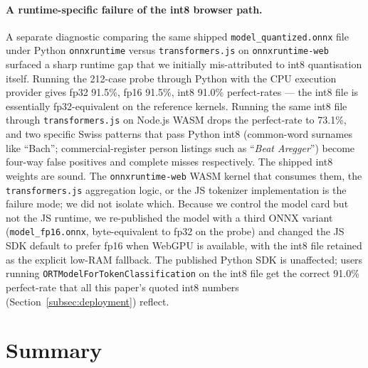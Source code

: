 \documentclass[sigconf,nonacm]{acmart}
\begin{document}
\paragraph{A runtime-specific failure of the int8 browser path.}
A separate diagnostic comparing the same shipped
\texttt{model\_quantized.onnx} file under Python
\texttt{onnxruntime} versus \texttt{transformers.js} on
\texttt{onnxruntime-web} surfaced a sharp runtime gap that we
initially mis-attributed to int8 quantisation itself. Running the
212-case probe through Python with the CPU execution provider gives
fp32 91.5\%, fp16 91.5\%, int8 91.0\% perfect-rates --- the int8
file is essentially fp32-equivalent on the reference kernels.
Running the same int8 file through \texttt{transformers.js} on
Node.js WASM drops the perfect-rate to 73.1\%, and two specific
Swiss patterns that pass Python int8 (common-word surnames like
``Bach''; commercial-register person listings such as ``\textit{Beat
Aregger}'') become four-way false positives and complete misses
respectively. The shipped int8 weights are sound. The
\texttt{onnxruntime-web} WASM kernel that consumes them, the
\texttt{transformers.js} aggregation logic, or the JS tokenizer
implementation is the failure mode; we did not isolate which.
Because we control the model card but not the JS runtime, we
re-published the model with a third ONNX variant
(\texttt{model\_fp16.onnx}, byte-equivalent to fp32 on the probe)
and changed the JS SDK default to prefer fp16 when WebGPU is
available, with the int8 file retained as the explicit low-RAM
fallback. The published Python SDK is unaffected; users running
\texttt{ORTModelForTokenClassification} on the int8 file get the
correct 91.0\% perfect-rate that all this paper's quoted int8
numbers (Section~\ref{subsec:deployment}) reflect.

\section{Summary}
\label{sec:conclusion}
\end{document}
